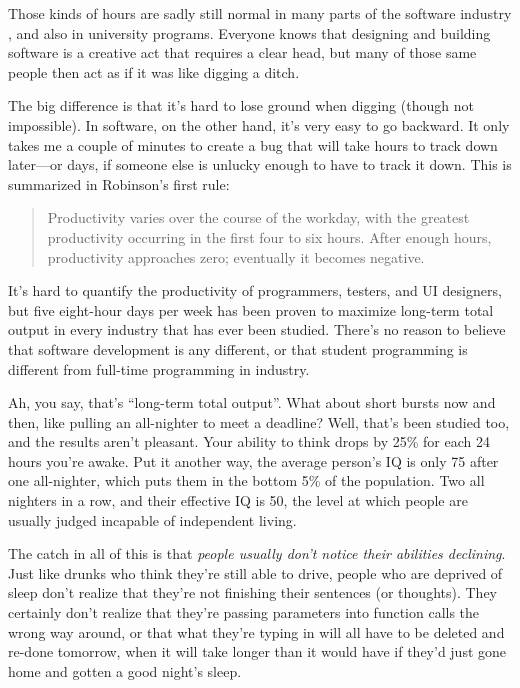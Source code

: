 \documentclass{report}
\begin{document}
Those kinds of hours are sadly still normal in many parts of the
software industry \cite{b:ea-spouse}, and also in university programs.
Everyone knows that designing and building software is a creative act
that requires a clear head, but many of those same people then act as
if it was like digging a ditch.

The big difference is that it's hard to lose ground when digging
(though not impossible).  In software, on the other hand, it's very
easy to go backward.  It only takes me a couple of minutes to
create a bug that will take hours to track down later---or days, if
someone else is unlucky enough to have to track it down.  This is
summarized in Robinson's first rule:

\begin{quotation}

  Productivity varies over the course of the workday, with the
  greatest productivity occurring in the first four to six
  hours. After enough hours, productivity approaches zero; eventually
  it becomes negative.

\end{quotation}

It's hard to quantify the productivity of programmers, testers, and
UI designers, but five eight-hour days per week has been proven to
maximize long-term total output in every industry that has ever been
studied.  There's no reason to believe that software development is
any different, or that student programming is different from full-time
programming in industry.

Ah, you say, that's ``long-term total output''.  What about short
bursts now and then, like pulling an all-nighter to meet a deadline?
Well, that's been studied too, and the results aren't pleasant.  Your
ability to think drops by 25\% for each 24 hours you're awake.  Put it
another way, the average person's IQ is only 75 after one all-nighter,
which puts them in the bottom 5\% of the population.  Two all nighters
in a row, and their effective IQ is 50, the level at which people are
usually judged incapable of independent living.

The catch in all of this is that \emph{people usually don't notice
their abilities declining}.  Just like drunks who think they're still
able to drive, people who are deprived of sleep don't realize that
they're not finishing their sentences (or thoughts).  They certainly
don't realize that they're passing parameters into function calls the
wrong way around, or that what they're typing in will all have to be
deleted and re-done tomorrow, when it will take longer than it would
have if they'd just gone home and gotten a good night's sleep.
\end{document}
